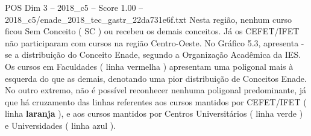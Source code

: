 \begin{textsample}{POS Dim 3 – 2018\_c5 – Score 1.00 – 2018\_c5/enade\_2018\_tec\_gastr\_22da731e6f.txt}
Nesta região, nenhum curso ficou Sem Conceito ( SC ) ou recebeu os demais conceitos.
Já os CEFET/IFET não participaram com cursos na região Centro-Oeste.
No Gráfico 5.3, apresenta -se a distribuição do Conceito Enade, segundo a Organização Acadêmica da IES.
Os cursos em Faculdades ( linha vermelha ) apresentam uma poligonal mais à esquerda do que as demais, denotando uma pior distribuição de Conceitos Enade.
No outro extremo, não é possível reconhecer nenhuma poligonal predominante, já que há cruzamento das linhas referentes aos cursos mantidos por CEFET/IFET ( linha \textbf{laranja} ), e aos cursos mantidos por Centros Universitários ( linha verde ) e Universidades ( linha azul ).

\end{textsample}
